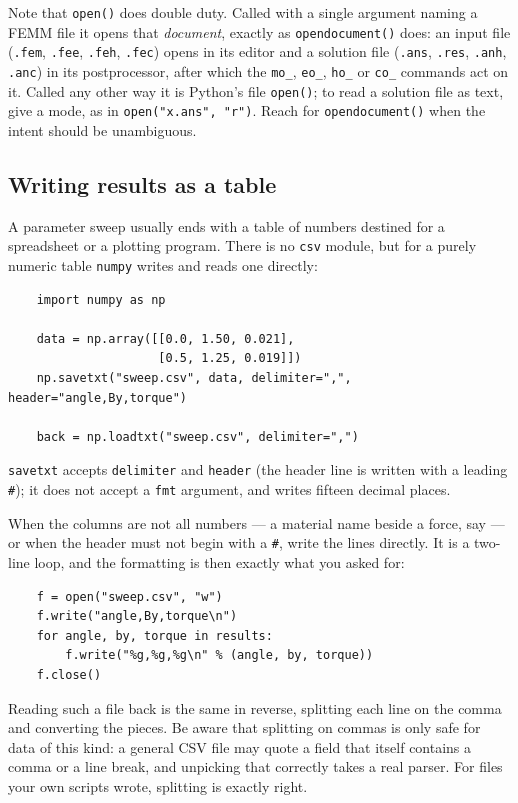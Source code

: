 Note that {\tt open()} does double duty.  Called with a single argument
naming a FEMM file it opens that {\em document}, exactly as
{\tt opendocument()} does: an input file ({\tt .fem}, {\tt .fee},
{\tt .feh}, {\tt .fec}) opens in its editor and a solution file
({\tt .ans}, {\tt .res}, {\tt .anh}, {\tt .anc}) in its postprocessor,
after which the {\tt mo\_}, {\tt eo\_}, {\tt ho\_} or {\tt co\_}
commands act on it.  Called any other way it is Python's file
{\tt open()}; to read a solution file as text, give a mode, as in
{\tt open("x.ans", "r")}.  Reach for {\tt opendocument()} when the
intent should be unambiguous.

\subsection*{Writing results as a table}

A parameter sweep usually ends with a table of numbers destined for a
spreadsheet or a plotting program.  There is no {\tt csv} module, but for a
purely numeric table {\tt numpy} writes and reads one directly:

\begin{verbatim}
    import numpy as np

    data = np.array([[0.0, 1.50, 0.021],
                     [0.5, 1.25, 0.019]])
    np.savetxt("sweep.csv", data, delimiter=",", header="angle,By,torque")

    back = np.loadtxt("sweep.csv", delimiter=",")
\end{verbatim}

{\tt savetxt} accepts {\tt delimiter} and {\tt header} (the header line is
written with a leading {\tt \#}); it does not accept a {\tt fmt} argument,
and writes fifteen decimal places.

When the columns are not all numbers --- a material name beside a force, say
--- or when the header must not begin with a {\tt \#}, write the lines
directly.  It is a two-line loop, and the formatting is then exactly what
you asked for:

\begin{verbatim}
    f = open("sweep.csv", "w")
    f.write("angle,By,torque\n")
    for angle, by, torque in results:
        f.write("%g,%g,%g\n" % (angle, by, torque))
    f.close()
\end{verbatim}

Reading such a file back is the same in reverse, splitting each line on the
comma and converting the pieces.  Be aware that splitting on commas is only
safe for data of this kind: a general CSV file may quote a field that itself
contains a comma or a line break, and unpicking that correctly takes a real
parser.  For files your own scripts wrote, splitting is exactly right.

